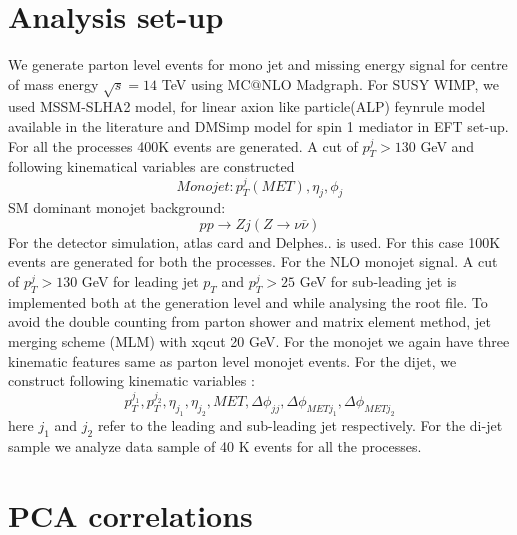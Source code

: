 \documentclass[aps,onecolumn,showpacs,superscriptaddress,groupedaddress,nofootinbib,preprint]{revtex4-1}
\newcommand{\be}{\begin{equation}}
\newcommand{\ee}{\end{equation}}
\begin{document}
\section{Analysis set-up\label{setup}}
We generate parton level events for mono jet and missing energy signal for centre of mass energy $\sqrt{s}=14$ TeV using MC$@$NLO
Madgraph. For SUSY WIMP, we used MSSM-SLHA2 model, for linear axion like particle(ALP) feynrule model available 
in the literature\cite{linearalps} and DMSimp\cite{} model for spin 1 mediator in EFT set-up. For all the processes 400K events are generated.
A cut of $p_T^j > 130$ GeV and following kinematical variables are constructed
\[ Monojet : p_T^j (MET) ,\eta_j, \phi_j  \]
SM dominant monojet background:
\be  pp \rightarrow Z j (Z \rightarrow \nu\bar\nu) \ee
For the detector simulation, atlas card and Delphes.. is used. For this case 100K events are generated for both the processes. 
For the  NLO monojet signal. A cut of $p_T^j > 130$ GeV for leading jet $p_T$ and $p_T^j > 25$ GeV  for sub-leading jet is implemented both at the generation 
level and while analysing the root file. To avoid the double counting from parton shower and matrix element method, jet merging scheme (MLM)
with xqcut 20 GeV. For the monojet we again have three kinematic features same as parton level monojet events. For the dijet, we 
construct following kinematic variables :
\[ p_T^{j_1}, p_T^{j_2}, \eta_{j_1}, \eta_{j_2}, MET, \Delta \phi_{jj}, \Delta \phi_{MET j_1}, \Delta \phi_{MET j_2} \]
here $j_1$ and $j_2$ refer to the leading and sub-leading jet respectively. For the di-jet sample we analyze data sample of 40 K events for all the processes.


\section{PCA correlations\label{PCA}}
\end{document}
